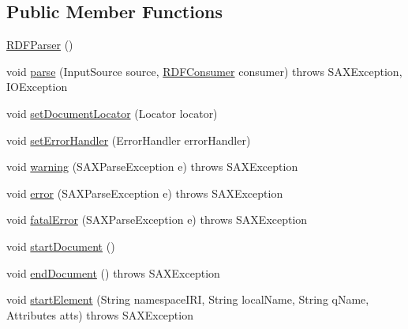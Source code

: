 \subsection*{Public Member Functions}
\begin{DoxyCompactItemize}
\item 
\hyperlink{classorg_1_1semanticweb_1_1owlapi_1_1rdf_1_1syntax_1_1_r_d_f_parser_abddfe6b1d7c4da72b10d9b1c727142a2}{R\-D\-F\-Parser} ()
\item 
void \hyperlink{classorg_1_1semanticweb_1_1owlapi_1_1rdf_1_1syntax_1_1_r_d_f_parser_aef4cbbbef29ecdf211d2cb870a531269}{parse} (Input\-Source source, \hyperlink{interfaceorg_1_1semanticweb_1_1owlapi_1_1rdf_1_1syntax_1_1_r_d_f_consumer}{R\-D\-F\-Consumer} consumer)  throws S\-A\-X\-Exception,             I\-O\-Exception 
\item 
void \hyperlink{classorg_1_1semanticweb_1_1owlapi_1_1rdf_1_1syntax_1_1_r_d_f_parser_a3b0992ede20eef3380115e6ae51e351a}{set\-Document\-Locator} (Locator locator)
\item 
void \hyperlink{classorg_1_1semanticweb_1_1owlapi_1_1rdf_1_1syntax_1_1_r_d_f_parser_a334ec91ce8b13c36c50912f9336e8520}{set\-Error\-Handler} (Error\-Handler error\-Handler)
\item 
void \hyperlink{classorg_1_1semanticweb_1_1owlapi_1_1rdf_1_1syntax_1_1_r_d_f_parser_a7da6b10690cb16d599661dd05511b6b7}{warning} (S\-A\-X\-Parse\-Exception e)  throws S\-A\-X\-Exception 
\item 
void \hyperlink{classorg_1_1semanticweb_1_1owlapi_1_1rdf_1_1syntax_1_1_r_d_f_parser_a9eb4b91273da6275a1f59808e1f476a2}{error} (S\-A\-X\-Parse\-Exception e)  throws S\-A\-X\-Exception 
\item 
void \hyperlink{classorg_1_1semanticweb_1_1owlapi_1_1rdf_1_1syntax_1_1_r_d_f_parser_a9a32cc4fdfcd1a6bd003e011a1855865}{fatal\-Error} (S\-A\-X\-Parse\-Exception e)  throws S\-A\-X\-Exception 
\item 
void \hyperlink{classorg_1_1semanticweb_1_1owlapi_1_1rdf_1_1syntax_1_1_r_d_f_parser_a4c8635f9f63a98bc06f1c842f6b004e2}{start\-Document} ()
\item 
void \hyperlink{classorg_1_1semanticweb_1_1owlapi_1_1rdf_1_1syntax_1_1_r_d_f_parser_aca791bd74c59940549a327211182bd59}{end\-Document} ()  throws S\-A\-X\-Exception 
\item 
void \hyperlink{classorg_1_1semanticweb_1_1owlapi_1_1rdf_1_1syntax_1_1_r_d_f_parser_a5177a8962032378f7d7e746e45c37d79}{start\-Element} (String namespace\-I\-R\-I, String local\-Name, String q\-Name, Attributes atts)  throws S\-A\-X\-Exception 

\end{DoxyCompactItemize}
